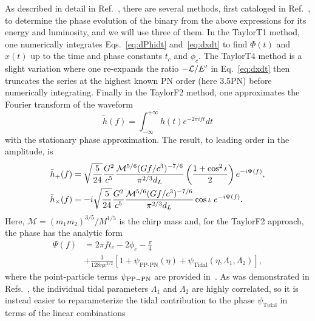 \documentclass[twocolumn,prd,amssymb,aps,nofootinbib,showpacs,epsf]{revtex4}
\begin{document}
As described in detail in Ref.~\cite{WadeCreightonOchsner2014}, there are several methods, first cataloged in Ref.~\cite{DamourIyerSathyaprakash2001}, to determine the phase evolution of the binary from the above expressions for its energy and luminosity, and we will use three of them.  In the TaylorT1 method, one numerically integrates Eqs.~\eqref{eq:dPhidt} and~\eqref{eq:dxdt} to find $\Phi(t)$ and $x(t)$ up to the time and phase constants $t_c$ and $\phi_c$. The TaylorT4 method is a slight variation where one re-expands the ratio $-{\cal L}/E^\prime$ in Eq.~\eqref{eq:dxdt} then truncates the series at the highest known PN order (here 3.5PN) before numerically integrating. Finally in the TaylorF2 method, one approximates the Fourier transform of the waveform
\begin{equation}
\tilde{h}(f)=\int_{-\infty}^{+\infty} h(t) e^{-2\pi i f t}dt
\end{equation}
with the stationary phase approximation. The result, to leading order in the amplitude, is
\begin{align}
\label{eq:hoffp}
\tilde{h}_+(f) &= \sqrt{\frac{5}{24}}\frac{G^2}{c^5}\frac{{\cal M}^{5/6}(Gf/c^3)^{-7/6}}{\pi^{2/3}d_L}\left(\frac{1+\cos^2\iota}{2}\right)e^{-i\Psi(f)},\\
\label{eq:hoffc}
\tilde{h}_\times(f) &= -i\sqrt{\frac{5}{24}}\frac{G^2}{c^5}\frac{{\cal M}^{5/6}(Gf/c^3)^{-7/6}}{\pi^{2/3}d_L}\cos\iota\mbox{ }e^{-i\Psi(f)}.
\end{align}
Here, $\mathcal{M} = (m_1 m_2)^{3/5}/M^{1/5}$ is the chirp mass and, for the TaylorF2 approach, the phase has the analytic form 
\begin{equation}
\begin{split}
\Psi(f) &= 2\pi f t_c - 2\phi_c -\frac{\pi}{4}\\
& +\frac{3}{128\eta x^{5/2}}\left[1+\psi_\text{PP-PN}(\eta)+\psi_\text{Tidal}(\eta, \Lambda_1, \Lambda_2)\right],
\end{split}
\end{equation}
where the point-particle terms $\psi_{\rm PP-PN}$ are provided in~\cite{BuonannoIyerOchsner2009}. As was demonstrated in Refs.~\cite{WadeCreightonOchsner2014,Favata2014}, the individual tidal parameters $\Lambda_1$ and $\Lambda_2$ are highly correlated, so it is instead easier to reparameterize the tidal contribution to the phase $\psi_\text{Tidal}$ in terms of the linear combinations
\end{document}
